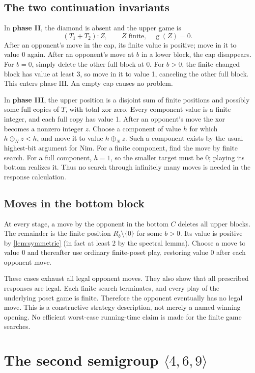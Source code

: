 \documentclass[11pt,letterpaper]{article}
\numberwithin{equation}{section}
\theoremstyle{definition}
\theoremstyle{remark}
\newcommand{\sg}{\operatorname{g}}
\newcommand{\nimadd}{\mathbin{\oplus_{\!N}}}
\begin{document}
\subsection{The two continuation invariants}

In \textbf{phase II}, the diamond is absent and the upper game is
\[
 (T_1+T_2):Z,\qquad Z\text{ finite},\quad\sg(Z)=0.
\]
After an opponent's move in the cap, its finite value is positive;
move in it to value 0 again. After an opponent's move at $b$ in a
lower block, the cap disappears. For $b=0$, simply delete the other
full block at 0. For $b>0$, the finite changed block has value at
least 3, so move in it to value 1, canceling the other full block.
This enters phase III. An empty cap causes no problem.

In \textbf{phase III}, the upper position is a disjoint sum of
finite positions and possibly some full copies of $T$, with total
xor zero. Every component value is a finite integer, and each full
copy has value 1. After an opponent's move the xor becomes a
nonzero integer $z$. Choose a component of value $h$ for which
$h\nimadd z<h$, and move it to value $h\nimadd z$. Such a
component exists by the usual highest-bit argument for Nim.
For a finite component, find the move by finite search. For a
full component, $h=1$, so the smaller target must be 0; playing
its bottom realizes it. Thus no search through infinitely many
moves is needed in the response calculation.

\subsection{Moves in the bottom block}

At every stage, a move by the opponent in the bottom $C$ deletes
all upper blocks. The remainder is the finite position
$R_b\setminus\{0\}$ for some $b>0$. Its value is positive by
\cref{lem:symmetric} (in fact at least 2 by the spectral lemma).
Choose a move to value 0 and thereafter use ordinary finite-poset
play, restoring value 0 after each opponent move.

These cases exhaust all legal opponent moves. They also show that
all prescribed responses are legal. Each finite search terminates,
and every play of the underlying poset game is finite. Therefore
the opponent eventually has no legal move. This is a constructive
strategy description, not merely a named winning opening.
No efficient worst-case running-time claim is made for the finite
game searches.

\section{The second semigroup \texorpdfstring{$\langle4,6,9\rangle$}{<4,6,9>}}
\label{sec:second}
\end{document}
